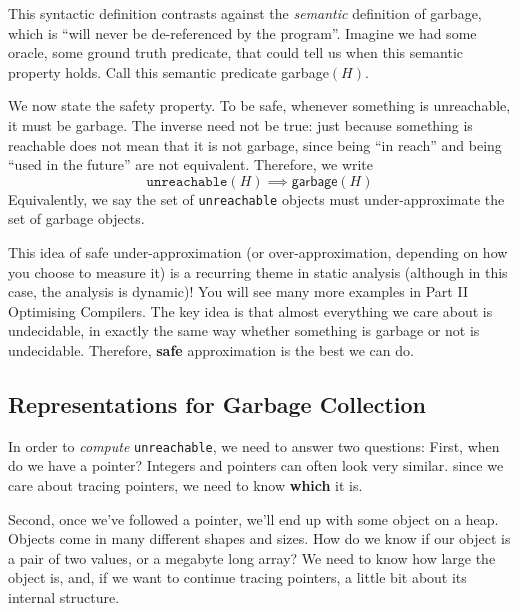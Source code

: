This syntactic definition contrasts against the \textit{semantic} definition of garbage, which is ``will never be de-referenced by the program''. Imagine we had some oracle, some ground truth predicate, that could tell us when this semantic property holds. Call this semantic predicate \textsf{garbage}$(H)$.

We now state the safety property. To be safe, whenever something is unreachable, it must be garbage. The inverse need not be true: just because something is reachable does not mean that it is not garbage, since being ``in reach'' and being ``used in the future'' are not equivalent. Therefore, we write
\[\texttt{unreachable}(H) \implies \textsf{garbage}(H) \]
Equivalently, we say the set of \texttt{unreachable} objects must under-approximate the set of \textsf{garbage} objects. 

This idea of safe under-approximation (or over-approximation, depending on how you choose to measure it) is a recurring theme in static analysis (although in this case, the analysis is dynamic)! You will see many more examples in \textsf{Part II Optimising Compilers}. The key idea is that almost everything we care about is undecidable, in exactly the same way whether something is garbage or not is undecidable. Therefore, \textbf{safe} approximation is the best we can do.

\subsection{Representations for Garbage Collection}
In order to \textit{compute} \texttt{unreachable}, we need to answer two questions: First, when do we have a pointer? Integers and pointers can often look very similar. since we care about tracing pointers, we need to know \textbf{which} it is. 

Second, once we've followed a pointer, we'll end up with some object on a heap. Objects come in many different shapes and sizes. How do we know if our object is a pair of two values, or a megabyte long array? We need to know how large the object is, and, if we want to continue tracing pointers, a little bit about its internal structure.

